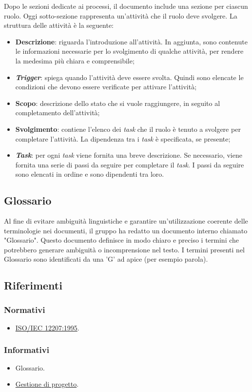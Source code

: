 Dopo le sezioni dedicate ai processi, il documento include una sezione per
ciascun ruolo. Oggi sotto-sezione rappresenta un'attività che il ruolo deve
svolgere.  La struttura delle attività è la seguente:
\begin{itemize}
	\item \textbf{Descrizione}: riguarda l'introduzione all'attività.
	      In aggiunta, sono contenute le informazioni necessarie per lo
	      svolgimento di qualche attività, per rendere la medesima più chiara e
	      comprensibile;

	\item \textbf{\textit{Trigger}}: spiega quando l'attività deve essere
	      svolta. Quindi sono elencate le condizioni che devono essere
	      verificate per attivare l'attività;

	\item \textbf{Scopo}: descrizione dello stato che si vuole raggiungere, in
	      seguito al completamento dell'attività;

	\item \textbf{Svolgimento}: contiene l'elenco dei \textit{task} che il
	      ruolo è tenuto a svolgere per completare l'attività. La dipendenza tra
	      i \textit{task} è specificata, se presente;

	\item \textbf{\textit{Task}}: per ogni \textit{task} viene fornita una
	      breve descrizione. Se necessario, viene fornita una serie di passi da
	      seguire per completare il \textit{task}. I passi da seguire sono
	      elencati in ordine e sono dipendenti tra loro.
\end{itemize}

\subsection{Glossario}
Al fine di evitare ambiguità linguistiche e garantire un’utilizzazione coerente delle terminologie nei documenti, il gruppo ha redatto un documento interno chiamato "Glossario". Questo
documento definisce in modo chiaro e preciso i termini che potrebbero generare ambiguità
o incomprensione nel testo. I termini presenti nel Glossario sono identificati da una ’G’ ad
apice (per esempio parola\g ).


\subsection{Riferimenti}

\subsubsection{Normativi}
\begin{itemize}
	\item \href{https://www.math.unipd.it/~tullio/IS-1/2009/Approfondimenti/ISO_12207-1995.pdf}{ISO/IEC 12207:1995}.
\end{itemize}

\subsubsection{Informativi}
\begin{itemize}
	\item Glossario.
	\item \href{https://www.math.unipd.it/~tullio/IS-1/2023/Dispense/T4.pdf}{Gestione di progetto}.
\end{itemize}
